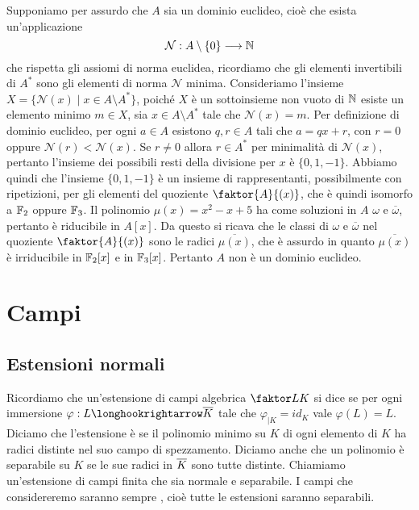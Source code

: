 \documentclass[11pt]{scrartcl}
\begin{document}
Supponiamo per assurdo che $A$ sia un dominio euclideo, cioè che esista
un'applicazione 
\[
    \mathcal{N}: A\setminus \{0\} \longrightarrow \mathbb N
\]
che rispetta gli assiomi di norma euclidea, ricordiamo che gli elementi 
invertibili di $A^*$ sono gli elementi di norma $\mathcal{N}$ minima. 
Consideriamo l'insieme $X = \{\mathcal{N}(x)\mid x \in A\setminus A^*\}$,
poiché $X$ è un sottoinsieme non vuoto di $\mathbb N$ esiste un elemento minimo 
$m \in X$, sia $x \in A\setminus A^*$ tale che $\mathcal{N}(x) = m$.
Per definizione di dominio euclideo, per ogni $a \in A$ esistono $q, r \in A$
tali che $a = qx + r$, con $r = 0$ oppure $\mathcal{N}(r) < \mathcal{N}(x)$.
Se $r \neq 0$ allora $r \in A^*$ per minimalità di $\mathcal{N}(x)$, pertanto 
l'insieme dei possibili resti della divisione per $x$ è $\{0, 1, -1\}$.
Abbiamo quindi che l'insieme $\{0, 1, -1\}$ è un insieme di rappresentanti, 
possibilmente con ripetizioni, per gli elementi del quoziente $\faktor{A}{(x)}$,
che è quindi isomorfo a $\mathbb F_2$ oppure $\mathbb F_3$.\newline
Il polinomio $\mu(x) = x^2 - x + 5$ ha come soluzioni in $A$ $\omega$ e $\overline{\omega}$,
pertanto è riducibile in $A[x]$. Da questo si ricava che le classi di $\omega$
e $\overline{\omega}$ nel quoziente $\faktor{A}{(x)}$ sono le radici $\overline{\mu(x)}$, 
che è assurdo in quanto $\overline{\mu(x)}$ è irriducibile in $\mathbb F_2[x]$ e in $\mathbb F_3[x]$. 
Pertanto $A$ non è un dominio euclideo.

\newpage

\section{Campi}

\subsection{Estensioni normali}

Ricordiamo che un'estensione di campi algebrica $\faktor L K$ si dice 
 se per ogni immersione $\varphi: L\longhookrightarrow \ol{K}$
tale che $\varphi_{\mid K} = id_K$ vale $\varphi(L) = L$. Diciamo che 
l'estensione è  se il polinomio minimo su $K$ di ogni elemento
di $K$ ha radici distinte nel suo campo di spezzamento. Diciamo anche che un 
polinomio è separabile su $K$ se le sue radici in $\overline{K}$ sono tutte distinte. 
Chiamiamo  un'estensione di campi finita che sia 
normale e separabile. I campi che considereremo saranno sempre ,
cioè tutte le estensioni saranno separabili.
\end{document}
